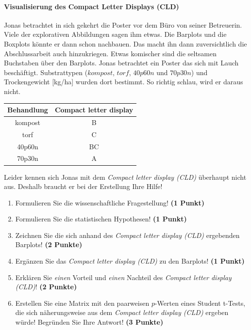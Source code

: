 \documentclass[a4paper, 9pt]{scrartcl}\usepackage[]{graphicx}\usepackage[]{xcolor}
\newenvironment{knitrout}{}{} %
\begin{document}
\ifcollection
\paragraph{Visualisierung des Compact Letter Displays (CLD)}
\fi

Jonas betrachtet in sich gekehrt die Poster vor dem Büro von seiner Betreuerin. Viele der explorativen Abbildungen sagen ihm etwas. Die Barplots und die Boxplots könnte er dann schon nachbauen. Das macht ihn dann zuversichtlich die Abschlussarbeit auch hinzukriegen. Etwas komischer sind die seltsamen Buchstaben über den Barplots. Jonas betrachtet ein Poster das sich mit Lauch beschäftigt. Substrattypen ($kompost$, $torf$, $40p60n$ und $70p30n$) und Trockengewicht [kg/ha] wurden dort bestimmt. So richtig schlau, wird er daraus nicht.

\begin{knitrout}
\color{fgcolor}\begin{table}[!h]
\centering\begingroup\fontsize{10}{12}\selectfont

\begin{tabular}{cc}
\toprule
\textbf{Behandlung} & \textbf{Compact letter display}\\
\midrule
kompost & B\\
torf & C\\
40p60n & BC\\
70p30n & A\\
\bottomrule
\end{tabular}
\endgroup{}
\end{table}

\end{knitrout}

Leider kennen sich Jonas mit dem \textit{Compact letter display (CLD)} überhaupt nicht aus. Deshalb braucht er bei der Erstellung Ihre Hilfe!

\begin{enumerate}
  \item Formulieren Sie die wissenschaftliche Fragestellung! \textbf{(1 Punkt)}
  \item Formulieren Sie die statistischen Hypothesen! \textbf{(1 Punkt)}
\item Zeichnen Sie die sich anhand des \textit{Compact letter display (CLD)} ergebenden Barplots! \textbf{(2 Punkte)}
\item Ergänzen Sie das \textit{Compact letter display (CLD)} zu den Barplots! \textbf{(1 Punkt)}
\item Erklären Sie \textit{einen} Vorteil und \textit{einen} Nachteil des \textit{Compact letter display (CLD)}! \textbf{(2 Punkte)}
\item Erstellen Sie eine Matrix mit den paarweisen $p$-Werten eines Student t-Tests, die sich näherungsweise aus dem \textit{Compact letter display (CLD)} ergeben würde! Begründen Sie Ihre Antwort! \textbf{(3 Punkte)}
\end{enumerate}
\end{document}
